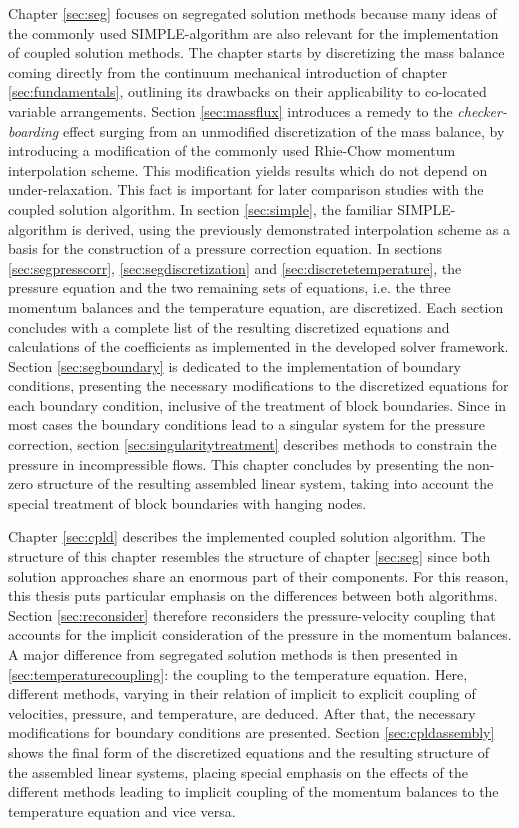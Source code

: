Chapter \ref{sec:seg} focuses on segregated solution methods because many ideas of the commonly used SIMPLE-algorithm are also relevant for the implementation of coupled solution methods. The chapter starts by discretizing the mass balance coming directly from the continuum mechanical introduction of chapter \ref{sec:fundamentals}, outlining its drawbacks on their applicability to co-located variable arrangements. Section \ref{sec:massflux} introduces a remedy to the \emph{checker-boarding} effect surging from an unmodified discretization of the mass balance, by introducing a modification of the commonly used Rhie-Chow \cite{rhie82} momentum interpolation scheme. This modification yields results which do not depend on under-relaxation. This fact is important for later comparison studies with the coupled solution algorithm. In section \ref{sec:simple}, the familiar SIMPLE-algorithm is derived, using the previously demonstrated interpolation scheme as a basis for the construction of a pressure correction equation. In sections \ref{sec:segpresscorr}, \ref{sec:segdiscretization} and \ref{sec:discretetemperature}, the pressure equation and the two remaining sets of equations, i.e. the three momentum balances and the temperature equation, are discretized. Each section concludes with a complete list of the resulting discretized equations and calculations of the coefficients as implemented in the developed solver framework. Section \ref{sec:segboundary} is dedicated to the implementation of boundary conditions, presenting the necessary modifications to the discretized equations for each boundary condition, inclusive of the treatment of block boundaries. Since in most cases the boundary conditions lead to a singular system for the pressure correction, section \ref{sec:singularitytreatment} describes methods to constrain the pressure in incompressible flows. This chapter concludes by presenting the non-zero structure of the resulting assembled linear system, taking into account the special treatment of block boundaries with hanging nodes.

Chapter \ref{sec:cpld} describes the implemented coupled solution algorithm. The structure of this chapter resembles the structure of chapter \ref{sec:seg} since both solution approaches share an enormous part of their components. For this reason, this thesis puts particular emphasis on the differences between both algorithms. Section \ref{sec:reconsider} therefore reconsiders the pressure-velocity coupling that accounts for the implicit consideration of the pressure in the momentum balances. A major difference from segregated solution methods is then presented in \ref{sec:temperaturecoupling}: the coupling to the temperature equation. Here, different methods, varying in their relation of implicit to explicit coupling of velocities, pressure, and temperature, are deduced. After that, the necessary modifications for boundary conditions are presented. Section \ref{sec:cpldassembly} shows the final form of the discretized equations and the resulting structure of the assembled linear systems, placing special emphasis on the effects of the different methods leading to implicit coupling of the momentum balances to the temperature equation and vice versa.

